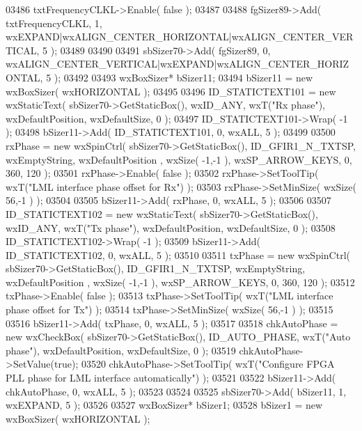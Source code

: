 \begin{DoxyCode}
03486     txtFrequencyCLKL->Enable( \textcolor{keyword}{false} );
03487     
03488     fgSizer89->Add( txtFrequencyCLKL, 1, wxEXPAND|wxALIGN\_CENTER\_HORIZONTAL|wxALIGN\_CENTER\_VERTICAL, 5 );
03489     
03490     
03491     sbSizer70->Add( fgSizer89, 0, wxALIGN\_CENTER\_VERTICAL|wxEXPAND|wxALIGN\_CENTER\_HORIZONTAL, 5 );
03492     
03493     wxBoxSizer* bSizer11;
03494     bSizer11 = \textcolor{keyword}{new} wxBoxSizer( wxHORIZONTAL );
03495     
03496     ID_STATICTEXT101 = \textcolor{keyword}{new} wxStaticText( sbSizer70->GetStaticBox(), wxID\_ANY, wxT(\textcolor{stringliteral}{"Rx phase"}), 
      wxDefaultPosition, wxDefaultSize, 0 );
03497     ID_STATICTEXT101->Wrap( -1 );
03498     bSizer11->Add( ID_STATICTEXT101, 0, wxALL, 5 );
03499     
03500     rxPhase = \textcolor{keyword}{new} wxSpinCtrl( sbSizer70->GetStaticBox(), ID_GFIR1_N_TXTSP, wxEmptyString, wxDefaultPosition
      , wxSize( -1,-1 ), wxSP\_ARROW\_KEYS, 0, 360, 120 );
03501     rxPhase->Enable( \textcolor{keyword}{false} );
03502     rxPhase->SetToolTip( wxT(\textcolor{stringliteral}{"LML interface phase offset for Rx"}) );
03503     rxPhase->SetMinSize( wxSize( 56,-1 ) );
03504     
03505     bSizer11->Add( rxPhase, 0, wxALL, 5 );
03506     
03507     ID_STATICTEXT102 = \textcolor{keyword}{new} wxStaticText( sbSizer70->GetStaticBox(), wxID\_ANY, wxT(\textcolor{stringliteral}{"Tx phase"}), 
      wxDefaultPosition, wxDefaultSize, 0 );
03508     ID_STATICTEXT102->Wrap( -1 );
03509     bSizer11->Add( ID_STATICTEXT102, 0, wxALL, 5 );
03510     
03511     txPhase = \textcolor{keyword}{new} wxSpinCtrl( sbSizer70->GetStaticBox(), ID_GFIR1_N_TXTSP, wxEmptyString, wxDefaultPosition
      , wxSize( -1,-1 ), wxSP\_ARROW\_KEYS, 0, 360, 120 );
03512     txPhase->Enable( \textcolor{keyword}{false} );
03513     txPhase->SetToolTip( wxT(\textcolor{stringliteral}{"LML interface phase offset for Tx"}) );
03514     txPhase->SetMinSize( wxSize( 56,-1 ) );
03515     
03516     bSizer11->Add( txPhase, 0, wxALL, 5 );
03517     
03518     chkAutoPhase = \textcolor{keyword}{new} wxCheckBox( sbSizer70->GetStaticBox(), ID_AUTO_PHASE, wxT(\textcolor{stringliteral}{"Auto phase"}), 
      wxDefaultPosition, wxDefaultSize, 0 );
03519     chkAutoPhase->SetValue(\textcolor{keyword}{true}); 
03520     chkAutoPhase->SetToolTip( wxT(\textcolor{stringliteral}{"Configure FPGA PLL phase for LML interface automatically"}) );
03521     
03522     bSizer11->Add( chkAutoPhase, 0, wxALL, 5 );
03523     
03524     
03525     sbSizer70->Add( bSizer11, 1, wxEXPAND, 5 );
03526     
03527     wxBoxSizer* bSizer1;
03528     bSizer1 = \textcolor{keyword}{new} wxBoxSizer( wxHORIZONTAL );

\end{DoxyCode}
